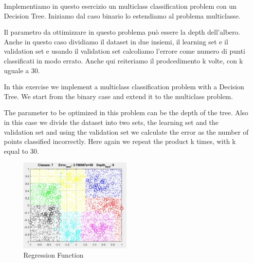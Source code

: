Implementiamo in questo esercizio un multiclass classification problem con un Decision Tree.
Iniziamo dal caso binario lo estendiamo al problema multiclasse.

Il parametro da ottimizzare in questo problema può essere la depth dell'albero. Anche in questo caso dividiamo il dataset in due insiemi, il learning set e il validation set e usando il validation set calcoliamo l'errore come numero di punti classificati in modo errato. Anche qui reiteriamo il prodcedimento k volte, con k uguale a 30.

In this exercise we implement a multiclass classification problem with a Decision Tree.
We start from the binary case and extend it to the multiclass problem.

The parameter to be optimized in this problem can be the depth of the tree. Also in this case we divide the dataset into two sets, the learning set and the validation set and using the validation set we calculate the error as the number of points classified incorrectly. Here again we repeat the product k times, with k equal to 30.

	\begin{figure}[h]
	\centering
	\includegraphics[width=0.5\textwidth]{i3.png}
	\caption{Regression Function}
	\label{fig:regression function}
\end{figure}